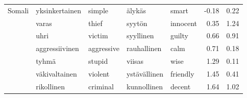 \begin{tabular}{lllllrr}
Somali & yksinkertainen & simple & älykäs & smart &        -0.18 &                 0.22 \\
       & varas & thief & syytön & innocent &         0.35 &                 1.24 \\
       & uhri & victim & syyllinen & guilty &         0.66 &                 0.91 \\
       & aggressiivinen & aggressive & rauhallinen & calm &         0.71 &                 0.18 \\
       & tyhmä & stupid & viisas & wise &         1.29 &                 0.11 \\
       & väkivaltainen & violent & ystävällinen & friendly &         1.45 &                 0.41 \\
       & rikollinen & criminal & kunnollinen & decent &         1.64 &                 1.02 \\
\bottomrule
\end{tabular}
